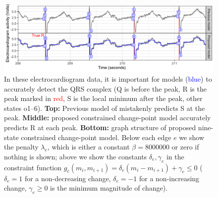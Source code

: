 \documentclass[12pt]{article}
\begin{document}
\begin{figure}[h]
    \centering
    \includegraphics[width=\textwidth]{figure-one-ecg-graph-data}
    
    
    \vskip -0.5cm
    \caption{In these electrocardiogram data, it is important for
      models (\textcolor{blue}{blue}) to accurately detect the QRS
      complex (Q is before the peak, R is the peak marked in
      \textcolor{red}{red}, S is the local minimum after the peak,
      other states o1--6). \textbf{Top:} Previous model of
      \citet{PanTompkins1985} mistakenly predicts S at the
      peak. \textbf{Middle:} proposed constrained change-point model
      accurately predicts R at each peak.  \textbf{Bottom:} graph
      structure of proposed nine-state constrained change-point model.
      Below each edge $e$ we show the penalty $\lambda_e$, which is
      either a constant $\beta=8000000$ or zero if nothing is shown; above
      we show the constants $\delta_e,\gamma_e$ in the constraint
      function
      $g_e(m_i,m_{i+1})= \delta_e(m_i - m_{i+1})+\gamma_e\leq 0$
      ($\delta_e=1$ for a non-decreasing change, $\delta_e=-1$ for a
      non-increasing change, $\gamma_e \geq 0$ is the minimum
      magnitude of change).
  }
\end{figure}



\end{document}
